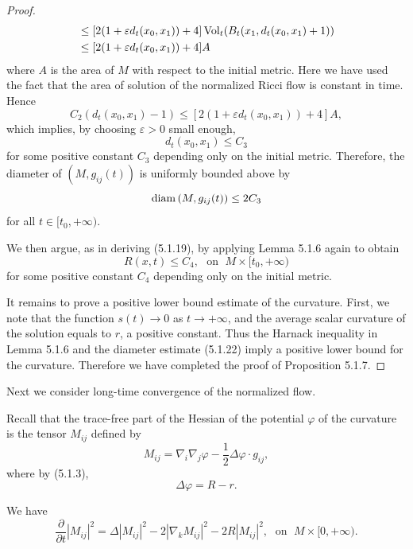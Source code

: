 \begin{proof}
\begin{displaymath}
\begin{split}
&  \leq [2(1+\varepsilon d_t(x_0,x_1))+4]
\operatorname{Vol}_t(B_t(x_1,d_t(x_0,x_1)+1))\\
&  \leq [2(1+\varepsilon d_t(x_0,x_1))+4]A
\end{split}
\end{displaymath}
where $A$ is the area of $M$ with respect to the initial metric.
Here we have used the fact that the area of solution of the
normalized Ricci flow is constant in time. Hence
$$
C_2(d_t(x_0,x_1)-1)\leq[2(1+\varepsilon d_t(x_0,x_1))+4] A,
$$
which implies, by choosing $\varepsilon>0$ small enough,
$$
d_t(x_0,x_1)\leq C_3
$$
for some positive constant $C_3$ depending only on the initial
metric. Therefore, the diameter of $(M,g_{ij}(t))$ is uniformly
bounded above by \begin{equation}
{\rm diam}\,(M,g_{ij}(t))\leq 2C_3  %
\end{equation} for all $t\in[t_0,+\infty)$.

We then argue, as in deriving (5.1.19), by applying Lemma 5.1.6
again to obtain
$$
R(x,t)\leq C_4,\ \ \ \text{on }\; M\times[t_0,+\infty)
$$
for some positive constant $C_4$ depending only on the initial
metric.

It remains to prove a positive lower bound estimate of the
curvature. First, we note that the function $s(t)\to 0$ as
$t\rightarrow+\infty$, and the average scalar curvature of the
solution equals to $r$, a positive constant. Thus the Harnack
inequality in Lemma 5.1.6 and the diameter estimate (5.1.22) imply
a positive lower bound for the curvature. Therefore we have
completed the proof of Proposition 5.1.7.
\end{proof}

Next we consider long-time convergence of the normalized flow.

Recall that the trace-free part of the Hessian of the potential
$\varphi$ of the curvature is the tensor $M_{ij}$ defined by
$$
M_{ij}=\nabla_i\nabla_j\varphi-\frac{1}{2}\Delta\varphi\cdot
g_{ij},
$$
where by (5.1.3),
$$
\Delta\varphi=R-r.
$$

\begin{lemma} 
  \label{lem:cz-tracefree-hessian-evolution}

We have \begin{equation} \frac{\partial}{\partial t}|M_{ij}|^2
=\Delta|M_{ij}|^2-2|\nabla_k M_{ij}|^2-2R|M_{ij}|^2,
\; \text{ on }\; M\times[0,+\infty). %
\end{equation}
\end{lemma}

